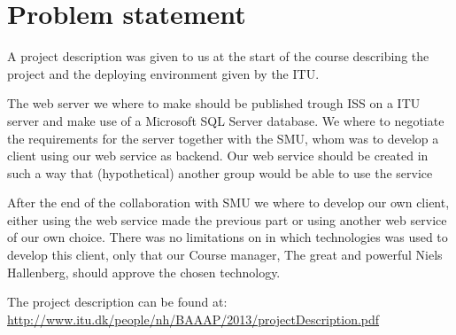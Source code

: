 \section{Problem statement}
A project description was given to us at the start of the course describing the project and the deploying environment given by the ITU.

The web server we where to make should be published trough ISS on a ITU server and make use of a Microsoft SQL Server database.
We where to negotiate the requirements for the server together with the SMU, whom was to develop a client using our web service as backend.
Our web service should be created in such a way that (hypothetical) another group would be able to use the service

After the end of the collaboration with SMU we where to develop our own client, either using the web service made the previous part or using another web service of our own choice.
There was no limitations on in which technologies was used to develop this client, only that our Course manager, The great and powerful Niels Hallenberg, should approve the chosen technology.

The project description can be found at: \url{http://www.itu.dk/people/nh/BAAAP/2013/projectDescription.pdf}
\newpage